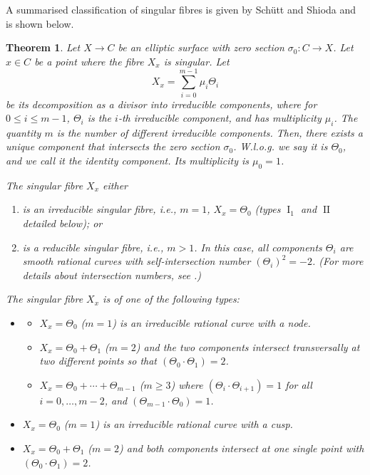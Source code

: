 \documentclass{report}
\DeclareMathOperator{\I}{I}
\DeclareMathOperator{\II}{II}
\DeclareMathOperator{\III}{III}
\newtheorem{theorem}[equation]{Theorem}
\theoremstyle{definition}
\begin{document}
A summarised classification of singular fibres is given by Sch\"{u}tt and Shioda \cite[Section~5.4]{schuett2019mordell} and is shown below.

\begin{theorem}
Let $X\rightarrow C$ be an elliptic surface with zero section $\sigma_0:C\rightarrow X$. Let $x\in C$ be a point where the fibre $X_x$ is singular. Let
\[X_x=\sum_{i=0}^{m-1}\mu_i\Theta_i\]
be its decomposition as a divisor into irreducible components, where for $0\leq i\leq m-1$, $\Theta_i$ is the $i$-th irreducible component, and has multiplicity $\mu_i$. The quantity $m$ is the number of different irreducible components.
Then, there exists a unique component that intersects the zero section $\sigma_0$. W.l.o.g. we say it is $\Theta_0$, and we call it the identity component. Its multiplicity is $\mu_0=1$.

The singular fibre $X_x$ either
\begin{enumerate}[label=(\roman*)]
\item is an irreducible singular fibre, i.e., $m=1$, $X_x=\Theta_0$ (types $\I_1$ and $\II$ detailed below); or
\item is a reducible singular fibre, i.e., $m>1$. In this case, all components $\Theta_i$ are smooth rational curves with self-intersection number $(\Theta_i)^2=-2$. (For more details about intersection numbers, see \cite[Lecture~12]{mumford1966lectures}.)
\end{enumerate}

The singular fibre $X_x$ is of one of the following types:

\begin{itemize}
\item[$\I_m$:]
\begin{itemize}
\item[$\I_1$:] $X_x=\Theta_0$ ($m=1$) is an irreducible rational curve with a node.
\item[$\I_2$:] $X_x=\Theta_0+\Theta_1$ ($m=2$) and the two components intersect transversally at two different points so that $(\Theta_0\cdot\Theta_1)=2$.
\item[$\I_m$:] $X_x=\Theta_0+\cdots+\Theta_{m-1}$ ($m\geq3$) where $(\Theta_i\cdot\Theta_{i+1})=1$ for all $i=0,\ldots,m-2$, and $(\Theta_{m-1}\cdot\Theta_0)=1$.
\end{itemize}

\item[$\II$:] $X_x=\Theta_0$ ($m=1$) is an irreducible rational curve with a cusp.

\item[$\III$:] $X_x=\Theta_0+\Theta_1$ ($m=2$) and both components intersect at one single point with $(\Theta_0\cdot\Theta_1)=2$.


\end{itemize}
\end{theorem}
\end{document}
